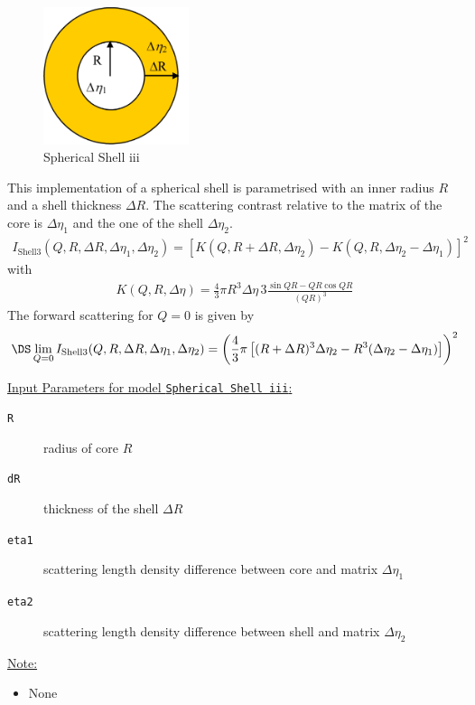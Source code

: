 \begin{figure}[htb]
\begin{center}
\includegraphics[width=0.38\textwidth,height=0.3575\textwidth]{../images/form_factor/spheres/shell3.png}
\end{center}
\caption{Spherical Shell iii} \label{fig:shell3}
\end{figure}
This implementation of a spherical shell is parametrised with an inner radius $R$ and a shell
thickness $\Delta R$. The scattering contrast relative to the matrix of the core is $ \Delta \eta_1$
and the one of the shell $\Delta\eta_2$.
\begin{align}
I_\text{Shell3}(Q,R,\Delta R,\Delta\eta_1,\Delta\eta_2)=
\left[K(Q,R+\Delta
R,\Delta\eta_2)-K(Q,R,\Delta\eta_2-\Delta\eta_1)\right]^2
\end{align}
with
\begin{align}
 K(Q,R,\Delta\eta) = \frac{4}{3}\pi R^3 \Delta\eta \, 3 \frac{\sin QR - QR \cos QR}{(QR)^3}
\end{align}
The forward scattering for $Q=0$ is given by
$$
\DS \lim_{Q=0}I_\text{Shell3}(Q,R,\Delta R,\Delta\eta_1,\Delta\eta_2)
= \left(\frac{4}{3}\pi \left[(R+\Delta R)^3\Delta\eta_2
                            - R^3(\Delta\eta_2-\Delta\eta_1)\right]\right)^2
$$

\vspace{5mm}
\noindent  \underline{Input Parameters for model \texttt{Spherical Shell iii}:}
\begin{description}
\item[\texttt{R}] radius of core $R$
\item[\texttt{dR}] thickness of the shell $\Delta R$
\item[\texttt{eta1}] scattering length density difference between core and matrix $\Delta\eta_1$
\item[\texttt{eta2}] scattering length density difference between shell and matrix $\Delta\eta_2$
\end{description}

\noindent\underline{Note:}
\begin{itemize}
\item[~] None
\end{itemize}


